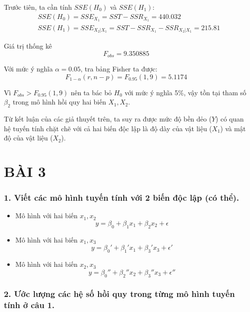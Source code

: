 \documentclass[a4paper]{article}
\theoremstyle{nonumberplain}
\begin{document}
\begin{enumerate}
	Trước tiên, ta cần tính $SSE (H_0)$ và $SSE(H_1)$:
	\begin{align*}
		&SSE(H_0) = SSE_{X_1} = SST - SSR_{X_1} = 440.032\\
		&SSE(H_1) = SSE_{X_2|X_1} = SST - SSR_{X_1} - SSR_{X_2|X_1} = 215.81
	\end{align*}
	
	Giá trị thống kê $$F_{obs} = 9.350885$$
	
	Với mức ý nghĩa $\alpha = 0.05$, tra bảng Fisher ta được:
	$$F_{1-\alpha}(r,n-p) = F_{0.95}(1,9) = 5.1174$$
	
	Vì $F_{obs} > F_{0.95}(1,9)$ nên ta bác bỏ $H_0$ với mức ý nghĩa 5\%, vậy tồn tại tham số $\beta_2$ trong mô hình hồi quy hai biến $X_1, X_2$.
\end{enumerate}

Từ kết luận của các giả thuyết trên, ta suy ra được mức độ bền dẻo ($Y$) có quan hệ tuyến tính chặt chẽ với cả hai biến độc lập là độ dày của vật liệu ($X_1$) và mật độ của vật liệu ($X_2$).

\newpage
\section*{BÀI 3}

\subsubsection*{1. Viết các mô hình tuyến tính với 2 biến độc lập (có thể).}

\begin{itemize}
	\item Mô hình với hai biến $x_1, x_2$
	\begin{equation}\label{model:12}
		y = \beta_0 + \beta_1x_1 + \beta_2x_2 + \epsilon
	\end{equation}
	\item Mô hình với hai biến $x_1, x_3$
	\begin{equation}\label{model:13}
		y = \beta_0' + \beta_1'x_1 + \beta_3'x_3 + \epsilon'
	\end{equation}
	\item Mô hình với hai biến $x_2, x_3$
	\begin{equation}\label{model:23}
		y = \beta_0'' + \beta_2''x_2 + \beta_3''x_3 + \epsilon''
	\end{equation}
\end{itemize}

\subsubsection*{2. Ước lượng các hệ số hồi quy trong từng mô hình tuyến tính ở câu 1.}
\end{document}
